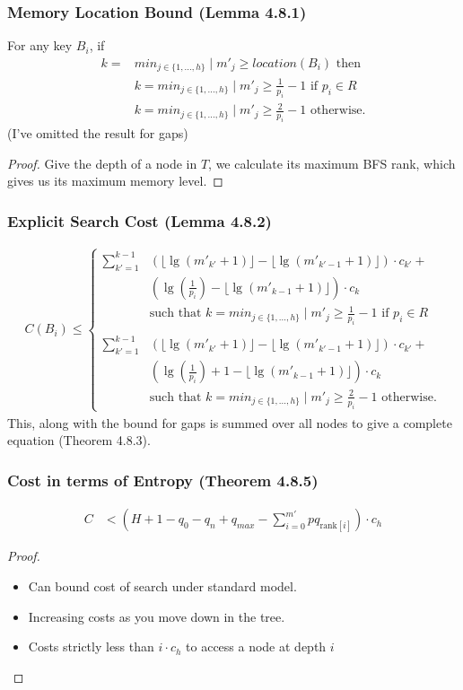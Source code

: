 \documentclass[]{beamer}
\theoremstyle{plain}
\begin{document}
\begin{frame}\frametitle{Memory Location Bound (Lemma 4.8.1)}
For any key $B_i$, if
\begin{align*}
k=&min_{j \in \{1, ..., h\}} \mid m'_j \geq location(B_i) \text{ then} \\
&k=min_{j \in \{1, ..., h\}} \mid m'_j \geq \frac{1}{p_i}-1 \text{ if } p_i \in R \\
&k=min_{j \in \{1, ..., h\}} \mid m'_j \geq \frac{2}{p_i}-1 \text{ otherwise.}
\end{align*}
(I've omitted the result for gaps)
\begin{proof}
Give the depth of a node in $T$, we calculate its maximum BFS rank, which gives us its maximum memory level.
\end{proof}
\end{frame}

\begin{frame}\frametitle{Explicit Search Cost (Lemma 4.8.2)}
\begin{align*} 
C(B_i) \leq 
\begin{cases}
 \sum_{k'=1}^{k-1} &\left(\lfloor \lg(m'_{k'}+1) \rfloor - \lfloor \lg(m'_{k'-1}+1) \rfloor \right)\cdot c_{k'}+ \\
 &\left(\lg(\frac{1}{p_i}) - \lfloor \lg(m'_{k-1}+1) \rfloor \right)\cdot c_k\\
&\text{such that } k=min_{j \in \{1, ..., h\}} \mid m'_j \geq \frac{1}{p_i}-1 \text{ if } p_i \in R \\\\
 \sum_{k'=1}^{k-1} &\left(\lfloor \lg(m'_{k'}+1) \rfloor - \lfloor \lg(m'_{k'-1}+1) \rfloor \right)\cdot c_{k'}+ \\
 &\left(\lg(\frac{1}{p_i}) + 1 - \lfloor \lg(m'_{k-1}+1) \rfloor \right)\cdot c_k\\
&\text{such that } k=min_{j \in \{1, ..., h\}} \mid m'_j \geq \frac{2}{p_i}-1 \text{ otherwise.}  
\end{cases}
\end{align*}
This, along with the bound for gaps is summed over all nodes to give a complete equation (Theorem 4.8.3).
\end{frame}

\begin{frame}\frametitle{Cost in terms of Entropy (Theorem 4.8.5)}
\begin{align*}
C &<  (H + 1 - q_0 - q_n + q_{max} - \sum_{i=0}^{m'} pq_{\text{rank}[i]})\cdot c_h
\end{align*}
\begin{proof}
\begin{itemize}
\item Can bound cost of search under standard model.
\item Increasing costs as you move down in the tree.
\item Costs strictly less than $i \cdot c_h$ to access a node at depth $i$
\end{itemize}
\end{proof}
\end{frame}
\end{document}
